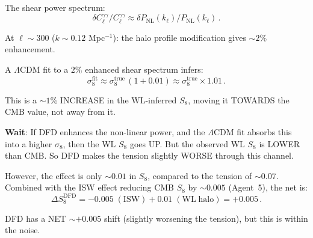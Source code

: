 \documentclass[11pt,a4paper]{article}
\begin{document}
The shear power spectrum:
\begin{equation}
\delta C_\ell^{\gamma\gamma}/C_\ell^{\gamma\gamma} \approx \delta P_{\mathrm{NL}}(k_\ell)/P_{\mathrm{NL}}(k_\ell)\,.
\end{equation}

At $\ell \sim 300$ ($k \sim 0.12$ Mpc$^{-1}$): the halo profile modification gives $\sim 2\%$ enhancement.

A $\Lambda$CDM fit to a $2\%$ enhanced shear spectrum infers:
\begin{equation}
\sigma_8^{\mathrm{fit}} \approx \sigma_8^{\mathrm{true}}\,(1 + 0.01) \approx \sigma_8^{\mathrm{true}} \times 1.01\,.
\end{equation}

This is a $\sim 1\%$ INCREASE in the WL-inferred $S_8$, moving it TOWARDS the CMB value, not away from it.

\textbf{Wait}: If DFD enhances the non-linear power, and the $\Lambda$CDM fit absorbs this into a higher $\sigma_8$, then the WL $S_8$ goes UP. But the observed WL $S_8$ is LOWER than CMB. So DFD makes the tension slightly WORSE through this channel.

However, the effect is only $\sim 0.01$ in $S_8$, compared to the tension of $\sim 0.07$. Combined with the ISW effect reducing CMB $S_8$ by $\sim 0.005$ (Agent~5), the net is:
\begin{equation}
\Delta S_8^{\mathrm{DFD}} = -0.005\;(\mathrm{ISW}) + 0.01\;(\mathrm{WL\;halo}) = +0.005\,.
\end{equation}

DFD has a NET $\sim +0.005$ shift (slightly worsening the tension), but this is within the noise.
\end{document}
